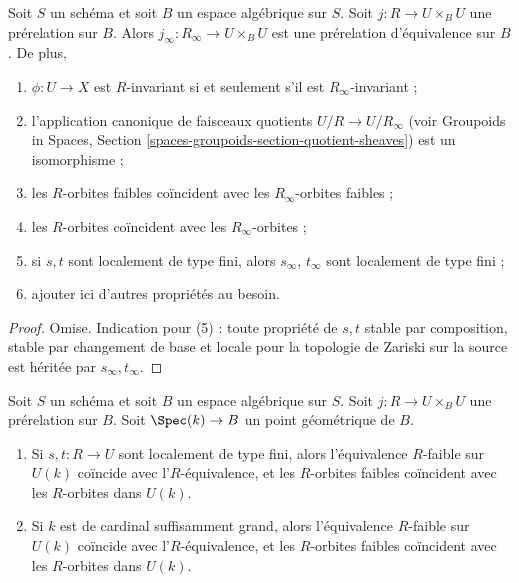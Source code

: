 \begin{lemma}
\label{lemma-make-pre-equivalence}
Soit $S$ un schéma et soit $B$ un espace algébrique sur $S$.
Soit $j : R \to U \times_B U$ une prérelation sur $B$.
Alors $j_\infty : R_\infty \to U \times_B U$ est une
prérelation d'équivalence sur $B$. De plus,
\begin{enumerate}
\item $\phi : U \to X$ est $R$-invariant si et seulement s'il est
$R_\infty$-invariant ;
\item l'application canonique de faisceaux quotients $U/R \to U/R_\infty$ (voir
Groupoids in Spaces, Section \ref{spaces-groupoids-section-quotient-sheaves})
est un isomorphisme ;
\item les $R$-orbites faibles coïncident avec les $R_\infty$-orbites faibles ;
\item les $R$-orbites coïncident avec les $R_\infty$-orbites ;
\item si $s, t$ sont localement de type fini, alors $s_\infty$, $t_\infty$
sont localement de type fini ;
\item ajouter ici d'autres propriétés au besoin.
\end{enumerate}
\end{lemma}

\begin{proof}
Omise. Indication pour (5) : toute propriété de $s, t$ stable par composition,
stable par changement de base et locale pour la topologie de Zariski sur la source
est héritée par $s_\infty, t_\infty$.
\end{proof}

\begin{lemma}
\label{lemma-geometric-orbits}
Soit $S$ un schéma et soit $B$ un espace algébrique sur $S$.
Soit $j : R \to U \times_B U$ une prérelation sur $B$.
Soit $\Spec(k) \to B$ un point géométrique de $B$.
\begin{enumerate}
\item Si $s, t : R \to U$ sont localement de type fini,
alors l'équivalence $R$-faible sur $U(k)$ coïncide avec l'$R$-équivalence, et
les $R$-orbites faibles coïncident avec les $R$-orbites dans $U(k)$.
\item Si $k$ est de cardinal suffisamment grand, alors l'équivalence $R$-faible
sur $U(k)$ coïncide avec l'$R$-équivalence, et les $R$-orbites faibles
coïncident avec les $R$-orbites dans $U(k)$.
\end{enumerate}
\end{lemma}

